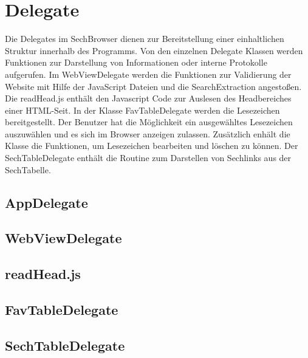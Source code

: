 
\section{Delegate}

Die Delegates im SechBrowser dienen zur Bereitstellung einer einhaltlichen Struktur innerhalb des Programms. Von den einzelnen Delegate Klassen werden Funktionen zur Darstellung von Informationen oder interne Protokolle aufgerufen. Im WebViewDelegate werden die Funktionen zur Validierung der Website mit Hilfe der JavaScript Dateien und die SearchExtraction angestoßen. Die readHead.js enthält den Javascript Code zur Auslesen des Headbereiches einer HTML-Seit. In der Klasse FavTableDelegate werden die Lesezeichen bereitgestellt. Der Benutzer hat die Möglichkeit ein ausgewähltes Lesezeichen auszuwählen und es sich im Browser anzeigen zulassen. Zusätzlich enhält die Klasse die Funktionen, um Lesezeichen bearbeiten und löschen zu können. Der SechTableDelegate enthält die Routine zum Darstellen von Sechlinks aus der SechTabelle. 
\subsection{AppDelegate}
\subsection{WebViewDelegate}
\subsection{readHead.js}
\subsection{FavTableDelegate}
\subsection{SechTableDelegate}

